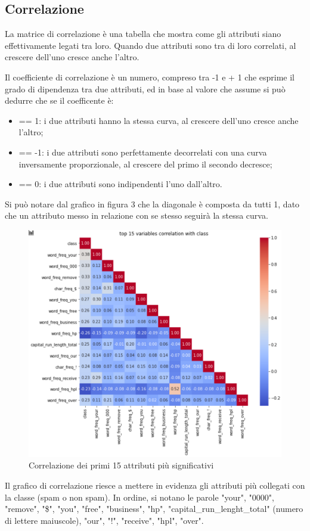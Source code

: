 \documentclass[12pt,a4paper]{article}
\begin{document}
\subsection{Correlazione}
La matrice di correlazione è una tabella che mostra come gli attributi  siano effettivamente legati tra loro. Quando due attributi sono tra di loro correlati, al crescere dell’uno cresce anche l’altro.

Il coefficiente di correlazione è un numero, compreso tra -1 e + 1 che esprime il grado di dipendenza tra due attributi, ed in base al valore che assume si può dedurre che se il coefficente è:

\begin{itemize}
\item == 1: i due attributi hanno la stessa curva, al crescere dell'uno cresce anche l'altro;
\item == -1: i due attributi sono perfettamente decorrelati con una curva inversamente proporzionale, al crescere del primo il secondo decresce;
\item == 0: i due attributi sono indipendenti l'uno dall'altro.
\end{itemize}
 Si può notare dal grafico in figura 3 che la diagonale è composta da tutti 1, dato che un attributo messo in relazione con se stesso seguirà la stessa curva.
\begin{figure}[H]
    \centering
    \includegraphics[width=1\columnwidth]{correlation_top_15.png}
    \caption{Correlazione dei primi 15 attributi più significativi}
\end{figure}
Il grafico di correlazione riesce a mettere in evidenza gli attributi più collegati con la classe (spam o non spam). In ordine, si notano le parole "your", "0000", "remove", "\$", "you", "free", "business", "hp", "capital\_run\_lenght\_total" (numero di lettere maiuscole), "our", "!", "receive", "hpl", "over".
\end{document}
